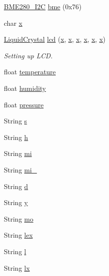 \begin{DoxyCompactItemize}
\item 
\hyperlink{class_b_m_e280___i2_c}{B\+M\+E280\+\_\+\+I2C} \hyperlink{_w_s_8ino_a2463f7d3b1d272d85b2aaa026d790416}{bme} (0x76)
\item 
char \hyperlink{_w_s_8ino_ab06e9aa782b61ccfb42f7c48996f6ed4}{x}
\item 
\hyperlink{class_liquid_crystal}{Liquid\+Crystal} \hyperlink{_w_s_8ino_ab5c27db0e833e3f4cf8f473022f11ecb}{lcd} (\hyperlink{_w_s_8ino_ab06e9aa782b61ccfb42f7c48996f6ed4}{x}, \hyperlink{_w_s_8ino_ab06e9aa782b61ccfb42f7c48996f6ed4}{x}, \hyperlink{_w_s_8ino_ab06e9aa782b61ccfb42f7c48996f6ed4}{x}, \hyperlink{_w_s_8ino_ab06e9aa782b61ccfb42f7c48996f6ed4}{x}, \hyperlink{_w_s_8ino_ab06e9aa782b61ccfb42f7c48996f6ed4}{x}, \hyperlink{_w_s_8ino_ab06e9aa782b61ccfb42f7c48996f6ed4}{x})
\begin{DoxyCompactList}\small\item\em Setting up L\+CD. \end{DoxyCompactList}\item 
float \hyperlink{_w_s_8ino_afc1d28cfbce795d6ea954ebe725241f5}{temperature}
\item 
float \hyperlink{_w_s_8ino_a6a87b2b0cff24d38b367ccd34843a206}{humidity}
\item 
float \hyperlink{_w_s_8ino_ac870e1249bab4a2a68cc4126761d24ef}{pressure}
\item 
String \hyperlink{_w_s_8ino_a5109c1e8d8d5228b4290813adb0be47b}{s}
\item 
String \hyperlink{_w_s_8ino_a5977e838367785a7176dc7d4106df5e3}{h}
\item 
String \hyperlink{_w_s_8ino_a27f338e2e1e0c6b4e800a9a05aeeb00f}{mi}
\item 
String \hyperlink{_w_s_8ino_a941e7622afb12acf931c6da1910cc461}{mi\+\_}
\item 
String \hyperlink{_w_s_8ino_a7e3f4a5179b8e7fc0d3cee2a12bb3f44}{d}
\item 
String \hyperlink{_w_s_8ino_a671dd85f94413cb1d3f4fa1877dded70}{y}
\item 
String \hyperlink{_w_s_8ino_ae87a77f51d231ab5614fdc0cc9734ae9}{mo}
\item 
String \hyperlink{_w_s_8ino_a50a22a42df187974707beaeeb46ee1ec}{lex}
\item 
String \hyperlink{_w_s_8ino_a3d755e761d498d63ec8ff4ba107f9b37}{l}
\item 
String \hyperlink{_w_s_8ino_a27093eb2a51400e98a5a829312514cab}{lx}
\item 

\end{DoxyCompactItemize}
